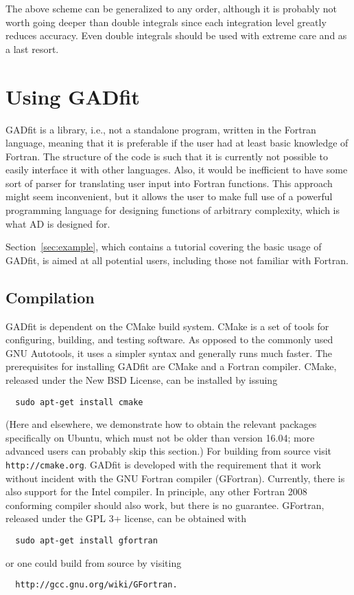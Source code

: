 \documentclass{article}
\begin{document}
The above scheme can be generalized to any order, although it is probably not worth going deeper than double integrals since each integration level greatly reduces accuracy. Even double integrals should be used with extreme care and as a last resort.

\section{Using GADfit}

GADfit is a library, i.e., not a standalone program, written in the Fortran language, meaning that it is preferable if the user had at least basic knowledge of Fortran. The structure of the code is such that it is currently not possible to easily interface it with other languages. Also, it would be inefficient to have some sort of parser for translating user input into Fortran functions. This approach might seem inconvenient, but it allows the user to make full use of a powerful programming language for designing functions of arbitrary complexity, which is what AD is designed for.

Section~\ref{sec:example}, which contains a tutorial covering the basic usage of GADfit, is aimed at all potential users, including those not familiar with Fortran.

\subsection{Compilation}

GADfit is dependent on the CMake build system. CMake is a set of tools for configuring, building, and testing software. As opposed to the commonly used GNU Autotools, it uses a simpler syntax and generally runs much faster. The prerequisites for installing GADfit are CMake and a Fortran compiler. CMake, released under the New BSD License, can be installed by issuing
\begin{verbatim}
  sudo apt-get install cmake
\end{verbatim}
(Here and elsewhere, we demonstrate how to obtain the relevant packages specifically on Ubuntu, which must not be older than version 16.04; more advanced users can probably skip this section.) For building from source visit \texttt{http://cmake.org}. GADfit is developed with the requirement that it work without incident with the GNU Fortran compiler (GFortran). Currently, there is also support for the Intel compiler. In principle, any other Fortran 2008 conforming compiler should also work, but there is no guarantee. GFortran, released under the GPL 3+ license, can be obtained with
\begin{verbatim}
  sudo apt-get install gfortran
\end{verbatim}
or one could build from source by visiting
\begin{verbatim}
  http://gcc.gnu.org/wiki/GFortran.
\end{verbatim}
\end{document}
